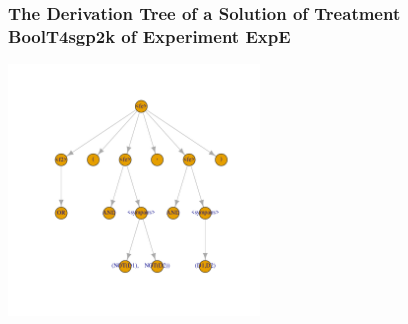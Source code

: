  \begin{frame}
 \frametitle{ The Derivation Tree of a Solution of Treatment BoolT4sgp2k of Experiment ExpE }
 \begin{center}
\includegraphics[width=0.5\textwidth, angle=0]
{ExpEDerivationTreeFigure000.pdf}
 \end{center}
 \label{report/ExpEDerivationTreeFigure000.pdf}  
 \end{frame}

